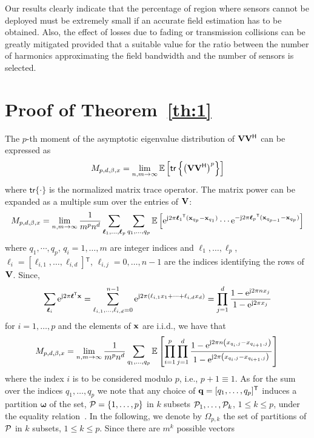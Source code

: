 \documentclass[11pt, draftcls, onecolumn, a4paper]{IEEEtran}
\newcommand{\ee}{{\rm e}}
\newcommand{\jj}{{\rm j}}  \newcommand{\ii}{{\rm i}}  \newcommand{\dd}{{\rm\,d}}
\newcommand{\ellv}{\boldsymbol{\ell}}
\newcommand{\qv}{{\bf q}}
\newcommand{\xv}{{\bf x}}
\newcommand{\Vm}{{\bf V}}
\newcommand{\Pc}{{\cal P}}
\newcommand{\omegav}{\boldsymbol{\omega}}
\def\tracen{\mathsf{tr}}
\def\Herm{\mathsf{^H}}
\def\Tran{\mathsf{^T}}
\def\non{\nonumber\\}
\begin{document}
Our results clearly indicate that the percentage of region where sensors cannot
be deployed must be extremely small if an accurate field estimation has to be obtained. Also, the effect of losses due to fading or transmission collisions
can be greatly mitigated provided that a suitable value for the
ratio between the number of harmonics approximating the field
bandwidth and the number of sensors is selected.


\appendices



\section{Proof of Theorem~\ref{th:1}}
\label{app:th1}
The $p$-th moment of the asymptotic eigenvalue distribution of
$\Vm\Vm\Herm$ can be expressed as~\cite{TSP2}
\[ M_{p,d,\beta,x}= \lim_{n,m \rightarrow \infty}\EE\left[\tracen\left\{\left(\Vm\Vm\Herm\right)^p\right\}\right] \]
where $\tracen \{\cdot\}$ is the normalized matrix trace operator.
The matrix power can be expanded as a multiple sum over the entries of
$\Vm$:
\[  M_{p,d,\beta,x}= \lim_{n,m \rightarrow \infty}\frac{1}{m^p n^{d}}\sum_{\ellv_1,\ldots,\ellv_p}\sum_{q_1,\ldots,q_p}\EE\left[ \ee^{\jj 2\pi \ellv_1\Tran (\xv_{q_p}-\xv_{q_1}) }\cdots \ee^{-\jj 2\pi \ellv_p\Tran (\xv_{q_{p-1}}-\xv_{q_{p}})} \right]  \]
where $q_1,\cdots,q_p$, $q_i = 1,\ldots,m$ are integer indices and
$\ellv_1,\ldots,\ellv_p$,
$\ellv_i=[\ell_{i,1},\ldots,\ellv_{i,d}]\Tran$,
$\ellv_{i,j}=0,\ldots,n-1$ are the indices identifying the rows of $\Vm$.
Since, 
\[ \sum_{\ellv_i} \ee^{\jj 2 \pi \ellv\Tran \xv} = \sum_{\ell_{i,1},\ldots,\ell_{i,d}=0}^{n-1} \ee^{\jj 2 \pi \left(\ell_{i,1} x_1+ \cdots + \ell_{i,d} x_d\right)} = \prod_{j=1}^d\frac{1-\ee^{\jj 2 \pi n x_j}}{1-\ee^{\jj 2 \pi x_j}} \]
for $i=1,\ldots,p$ and the elements of $\xv$ are i.i.d., we have that
\[ M_{p,d,\beta,x}
= \lim_{n,m \rightarrow \infty}\frac{1}{m^p n^d} \sum_{q_1,\ldots,q_p} \EE\left[\prod_{i=1}^p\prod_{j=1}^d\frac{1-\ee^{\jj 2 \pi n \left(x_{q_i,j}-x_{q_{i+1},j}\right)}}{1-\ee^{\jj 2 \pi\left(x_{q_i,j}-x_{q_{i+1},j}\right)}}  \right] \non
\]
where the index $i$ is to be considered modulo $p$, i.e., $p+1 \equiv
1$.  As for the sum over the indices $q_1,\ldots,q_p$ we note that any
choice of $\qv=[q_1,\ldots,q_p]\Tran$ induces a partition $\omegav$ of
the set, $\Pc=\{1,\ldots,p\}$ in $k$ subsets $\Pc_1,\ldots,\Pc_k$,
$1\le k \le p$, under the equality relation~\cite{TSP2}.  In the
following, we denote by $\Omega_{p,k}$ the set of partitions of $\Pc$
in $k$ subsets, $1\le k \le p$. Since there are $m^k$ possible vectors
\end{document}
